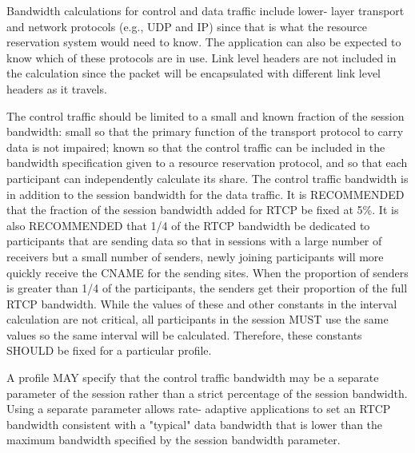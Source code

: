 \documentclass{article}
\begin{document}
Bandwidth calculations for control and data traffic include lower- layer transport and network protocols (e.g., UDP and IP) since that is what the resource reservation system would need to know.  The application can also be expected to know which of these protocols are in use.  Link level headers are not included in the calculation since the packet will be encapsulated with different link level headers as it travels.

The control traffic should be limited to a small and known fraction of the session bandwidth: small so that the primary function of the transport protocol to carry data is not impaired; known so that the control traffic can be included in the bandwidth specification given to a resource reservation protocol, and so that each participant can independently calculate its share.  The control traffic bandwidth is in addition to the session bandwidth for the data traffic.  It is RECOMMENDED that the fraction of the session bandwidth added for RTCP be fixed at 5\%.  It is also RECOMMENDED that 1/4 of the RTCP bandwidth be dedicated to participants that are sending data so that in sessions with a large number of receivers but a small number of senders, newly joining participants will more quickly receive the CNAME for the sending sites.  When the proportion of senders is greater than 1/4 of the participants, the senders get their proportion of the full RTCP bandwidth.  While the values of these and other constants in the interval calculation are not critical, all participants in the session MUST use the same values so the same interval will be calculated.  Therefore, these constants SHOULD be fixed for a particular profile.

A profile MAY specify that the control traffic bandwidth may be a separate parameter of the session rather than a strict percentage of the session bandwidth.  Using a separate parameter allows rate- adaptive applications to set an RTCP bandwidth consistent with a "typical" data bandwidth that is lower than the maximum bandwidth specified by the session bandwidth parameter.
\end{document}
